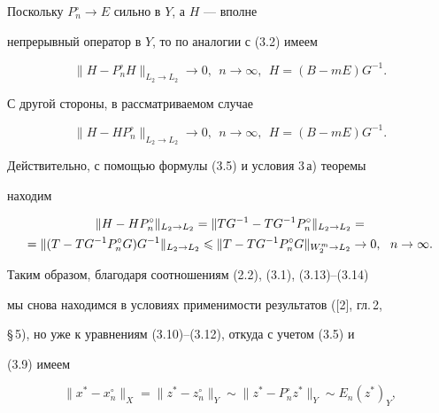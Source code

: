 Поскольку $P_n^\circ \to E$ сильно в $Y$, а $H$ --- вполне


непрерывный оператор в $Y$, то по аналогии с (3.2) имеем


\begin{equation}


\|H - P_n^\circ H\|_{L_2\to L_2}\to 0,\ \ n\to \infty,\ \ H = (B -


mE)G^{-1}.


\end{equation}


С другой стороны, в рассматриваемом случае


\begin{equation}


\|H - HP_n^\circ\|_{L_2\to L_2}\to 0,\ \ n\to \infty,\ \ H = (B -


mE)G^{-1}.


\end{equation}


Действительно, с помощью формулы (3.5) и условия 3\,а) теоремы


находим


\begin{multline*}


\|H-HP_n^\circ\|_{L_2\to L_2} = \|TG^{-1} - TG^{-


1}P_n^\circ\|_{L_2\to L_2} = \\


=\|(T - TG^{-1}P_n^\circ G)G^{-1}\|_{L_2\to L_2} \lea \|T - TG^{-


1}P_n^\circ G\|_{W_2^m\to L_2}\to 0,\ \ n\to\infty.


\end{multline*}





Таким образом, благодаря соотношениям (2.2), (3.1), (3.13)--(3.14)


мы снова находимся в условиях применимости результатов ([2], гл.\,2,


\S\,5), но уже к уравнениям (3.10)--(3.12), откуда с учетом (3.5) и


(3.9) имеем


\begin{equation}


\|x^* - x_n^\circ\|_X = \|z^* - z_n^\circ\|_Y \sim \|z^* -


P_n^\circ z^*\|_Y \sim E_n(z^*)_Y,


\end{equation}


